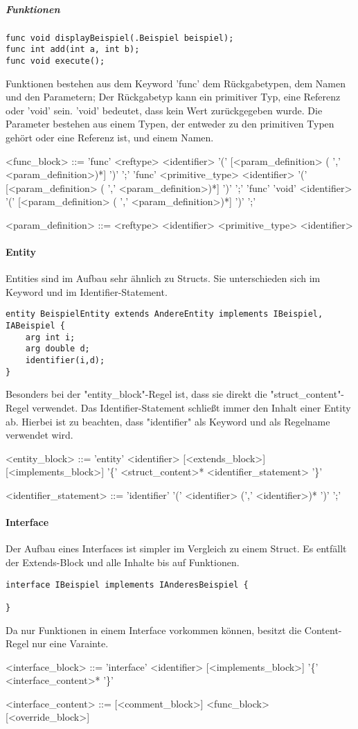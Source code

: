 \documentclass[./einleitung.tex]{subfiles}
\begin{document}
\subparagraph{Funktionen}
\begin{lstlisting}
func void displayBeispiel(.Beispiel beispiel);
func int add(int a, int b);
func void execute();
\end{lstlisting}
Funktionen bestehen aus dem Keyword 'func' dem Rückgabetypen, dem Namen und den Parametern;
Der Rückgabetyp kann ein primitiver Typ, eine Referenz oder 'void' sein. 'void' bedeutet, dass kein Wert zurückgegeben wurde. Die Parameter bestehen aus einem Typen, der entweder zu den primitiven Typen gehört oder eine Referenz ist, und einem Namen.
\begin{grammar}
<func_block> ::= 'func' <reftype> <identifier> '(' [<param_definition> ( ',' <param_definition>)*] ')' ';'
\alt 'func' <primitive_type> <identifier> '(' [<param_definition> ( ',' <param_definition>)*] ')' ';'
\alt 'func' 'void' <identifier> '(' [<param_definition> ( ',' <param_definition>)*] ')' ';'

<param_definition> ::= <reftype> <identifier>
\alt <primitive_type> <identifier>
\end{grammar}

\paragraph{Entity}
Entities sind im Aufbau sehr ähnlich zu Structs. Sie unterschieden sich im Keyword und im Identifier-Statement.
\begin{lstlisting}
entity BeispielEntity extends AndereEntity implements IBeispiel, IABeispiel {
    arg int i;
    arg double d;
    identifier(i,d);
}
\end{lstlisting}
Besonders bei der "entity_block"-Regel ist, dass sie direkt die "struct_content"-Regel verwendet. Das Identifier-Statement schließt immer den Inhalt einer Entity ab. Hierbei ist zu beachten, dass "identifier" als Keyword und als Regelname verwendet wird.
\begin{grammar}
<entity_block> ::= 'entity' <identifier> [<extends_block>] [<implements_block>] '\{' <struct_content>* <identifier_statement> '\}' 

<identifier_statement> ::= 'identifier' '(' <identifier> (',' <identifier>)* ')' ';'
\end{grammar}

\paragraph{Interface}
Der Aufbau eines Interfaces ist simpler im Vergleich zu einem Struct. Es entfällt der Extends-Block und alle Inhalte bis auf Funktionen.
\begin{lstlisting}
interface IBeispiel implements IAnderesBeispiel {

}
\end{lstlisting}
Da nur Funktionen in einem Interface vorkommen können, besitzt die Content-Regel nur eine Varainte.
\begin{grammar}
<interface_block> ::= 'interface' <identifier> [<implements_block>] '\{' <interface_content>* '\}'

<interface_content> ::= [<comment_block>] <func_block> [<override_block>]
\end{grammar}
\end{document}
